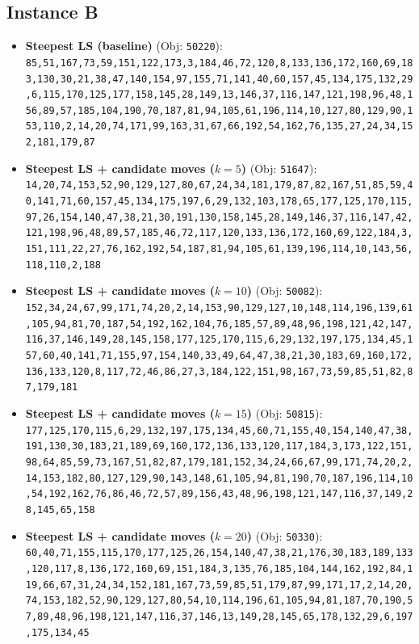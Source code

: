 \subsection{Instance B}
\begin{itemize}[leftmargin=1.5em]
    \item \textbf{Steepest LS (baseline)} (Obj: \texttt{50220}):\\
    \texttt{85,51,167,73,59,151,122,173,3,184,46,72,120,8,133,136,172,160,69,183,130,30,21,38,47,140,154,97,155,71,141,40,60,157,45,134,175,132,29,6,115,170,125,177,158,145,28,149,13,146,37,116,147,121,198,96,48,156,89,57,185,104,190,70,187,81,94,105,61,196,114,10,127,80,129,90,153,110,2,14,20,74,171,99,163,31,67,66,192,54,162,76,135,27,24,34,152,181,179,87}
    \item \textbf{Steepest LS + candidate moves ($k = 5$)} (Obj: \texttt{51647}):\\
    \texttt{14,20,74,153,52,90,129,127,80,67,24,34,181,179,87,82,167,51,85,59,40,141,71,60,157,45,134,175,197,6,29,132,103,178,65,177,125,170,115,97,26,154,140,47,38,21,30,191,130,158,145,28,149,146,37,116,147,42,121,198,96,48,89,57,185,46,72,117,120,133,136,172,160,69,122,184,3,151,111,22,27,76,162,192,54,187,81,94,105,61,139,196,114,10,143,56,118,110,2,188}
    \item \textbf{Steepest LS + candidate moves ($k = 10$)} (Obj: \texttt{50082}):\\
    \texttt{152,34,24,67,99,171,74,20,2,14,153,90,129,127,10,148,114,196,139,61,105,94,81,70,187,54,192,162,104,76,185,57,89,48,96,198,121,42,147,116,37,146,149,28,145,158,177,125,170,115,6,29,132,197,175,134,45,157,60,40,141,71,155,97,154,140,33,49,64,47,38,21,30,183,69,160,172,136,133,120,8,117,72,46,86,27,3,184,122,151,98,167,73,59,85,51,82,87,179,181}
    \item \textbf{Steepest LS + candidate moves ($k = 15$)} (Obj: \texttt{50815}):\\
    \texttt{177,125,170,115,6,29,132,197,175,134,45,60,71,155,40,154,140,47,38,191,130,30,183,21,189,69,160,172,136,133,120,117,184,3,173,122,151,98,64,85,59,73,167,51,82,87,179,181,152,34,24,66,67,99,171,74,20,2,14,153,182,80,127,129,90,143,148,61,105,94,81,190,70,187,196,114,10,54,192,162,76,86,46,72,57,89,156,43,48,96,198,121,147,116,37,149,28,145,65,158}
    \item \textbf{Steepest LS + candidate moves ($k = 20$)} (Obj: \texttt{50330}):\\
    \texttt{60,40,71,155,115,170,177,125,26,154,140,47,38,21,176,30,183,189,133,120,117,8,136,172,160,69,151,184,3,135,76,185,104,144,162,192,84,119,66,67,31,24,34,152,181,167,73,59,85,51,179,87,99,171,17,2,14,20,74,153,182,52,90,129,127,80,54,10,114,196,61,105,94,81,187,70,190,57,89,48,96,198,121,147,116,37,146,13,149,28,145,65,178,132,29,6,197,175,134,45}
\end{itemize}
